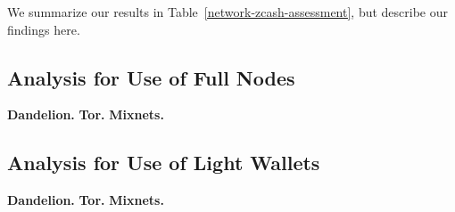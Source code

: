 \documentclass{article}
\begin{document}
We summarize our results in Table~\ref{network-zcash-assessment}, but describe
our findings here.

\subsection{Analysis for Use of Full Nodes}

\textbf{Dandelion.}
\textbf{Tor.}
\textbf{Mixnets.}

\subsection{Analysis for Use of Light Wallets}

\textbf{Dandelion.}
\textbf{Tor.}
\textbf{Mixnets.}



\end{document}

